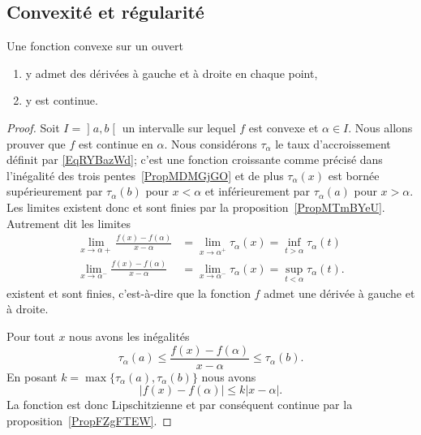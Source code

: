 \subsection{Convexité et régularité}

\begin{lemma}   \label{LemKLTsHIQ}
    Une fonction convexe sur un ouvert
    \begin{enumerate}
        \item
            y admet des dérivées à gauche et à droite en chaque point,
        \item
            y est continue.
    \end{enumerate}
\end{lemma}

\begin{proof}
    Soit \( I=\mathopen] a , b \mathclose[\) un intervalle sur lequel \( f\) est convexe et \( \alpha\in I\). Nous allons prouver que \( f\) est continue en \( \alpha\). Nous considérons \( \tau_{\alpha}\) le taux d'accroissement définit par \eqref{EqRYBazWd}; c'est une fonction croissante comme précisé dans l'inégalité des trois pentes~\ref{PropMDMGjGO} et de plus \( \tau_{\alpha}(x)\) est bornée supérieurement par \( \tau_{\alpha}(b)\) pour \( x<\alpha\) et inférieurement par \( \tau_{\alpha}(a)\) pour \( x>\alpha\). Les limites existent donc et sont finies par la proposition~\ref{PropMTmBYeU}. Autrement dit les limites
    \begin{subequations}
        \begin{align}
            \lim_{x\to \alpha+} \frac{ f(x)-f(\alpha) }{ x-\alpha }&=\lim_{x\to \alpha^+} \tau_{\alpha}(x)=\inf_{t>\alpha}\tau_{\alpha}(t)\\
            \lim_{x\to \alpha^-} \frac{ f(x)-f(\alpha) }{ x-\alpha }&=\lim_{x\to \alpha^-} \tau_{\alpha}(x)=\sup_{t<\alpha}\tau_{\alpha}(t).
        \end{align}
    \end{subequations}
    existent et sont finies, c'est-à-dire que la fonction \( f\) admet une dérivée à gauche et à droite.

    Pour tout \( x\) nous avons les inégalités
    \begin{equation}
        \tau_{\alpha}(a)\leq \frac{ f(x)-f(\alpha) }{ x-\alpha }\leq \tau_{\alpha}(b).
    \end{equation}
    En posant \( k=\max\{ \tau_{\alpha}(a),\tau_{\alpha}(b) \}\) nous avons
    \begin{equation}
        \big| f(x)-f(\alpha) \big|\leq k| x-\alpha |.
    \end{equation}
    La fonction est donc Lipschitzienne et par conséquent continue par la proposition~\ref{PropFZgFTEW}.
\end{proof}

